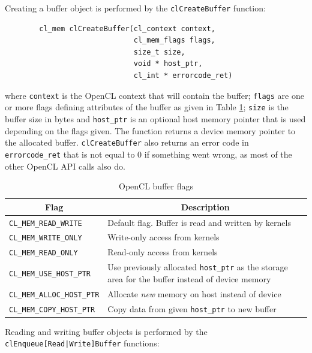 		Creating a buffer object is performed by the \texttt{clCreateBuffer} function:
		
		\begin{verbatim}
		cl_mem clCreateBuffer(cl_context context,
		                      cl_mem_flags flags,
		                      size_t size,
		                      void * host_ptr,
		                      cl_int * errorcode_ret)
		\end{verbatim}
		
		where \texttt{context} is the OpenCL context that will contain the buffer; \texttt{flags} are one or more flags defining attributes of the buffer as given in Table \ref{table:buffer_flags}; \texttt{size} is the buffer size in bytes and \texttt{host\_ptr} is an optional host memory pointer that is used depending on the flags given. The function returns a device memory pointer to the allocated buffer. \texttt{clCreateBuffer} also returns an error code in \texttt{errorcode\_ret} that is not equal to 0 if something went wrong, as most of the other OpenCL API calls also do.
		
		\begin{table}[h]
		\centering
		\begin{tabular}{| p{} p{} |}
			\hline
			\multicolumn{1}{|c}{\textbf{Flag}} & \multicolumn{1}{c|}{\textbf{Description}} \\
			\hline
			\hline
			\texttt{CL\_MEM\_READ\_WRITE} & Default flag. Buffer is read and written by kernels \\
			\texttt{CL\_MEM\_WRITE\_ONLY} & Write-only access from kernels \\
			\texttt{CL\_MEM\_READ\_ONLY} & Read-only access from kernels \\
			\texttt{CL\_MEM\_USE\_HOST\_PTR} & Use previously allocated \texttt{host\_ptr} as the storage area for the buffer instead of device memory \\
			\texttt{CL\_MEM\_ALLOC\_HOST\_PTR} & Allocate \emph{new} memory on host instead of device \\
			\texttt{CL\_MEM\_COPY\_HOST\_PTR} & Copy data from given \texttt{host\_ptr} to new buffer \\
			\hline
		\end{tabular}
		\caption{OpenCL buffer flags}
		\label{table:buffer_flags}
		\end{table}
		
		\clearpage
		
		Reading and writing buffer objects is performed by the \texttt{clEnqueue[Read|Write]Buffer} functions:
		
